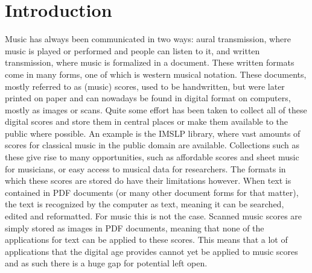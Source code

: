 \chapter{Introduction}\label{chap:introduction}

Music has always been communicated in two ways: aural transmission, where music is played or performed and people can listen to it, and written transmission, where music is formalized in a document. These written formats come in many forms, one of which is western musical notation. These documents, mostly referred to as (music) scores, used to be handwritten, but were later printed on paper and can nowadays be found in digital format on computers, mostly as images or scans. Quite some effort has been taken to collect all of these digital scores and store them in central places or make them available to the public where possible. An example is the IMSLP library, where vast amounts of scores for classical music in the public domain are available. Collections such as these give rise to many opportunities, such as affordable scores and sheet music for musicians, or easy access to musical data for researchers. The formats in which these scores are stored do have their limitations however. When text is contained in PDF documents (or many other document forms for that matter), the text is recognized by the computer as text, meaning it can be searched, edited and reformatted. For music this is not the case. Scanned music scores are simply stored as images in PDF documents, meaning that none of the applications for text can be applied to these scores. This means that a lot of applications that the digital age provides cannot yet be applied to music scores and as such there is a huge gap for potential left open.

